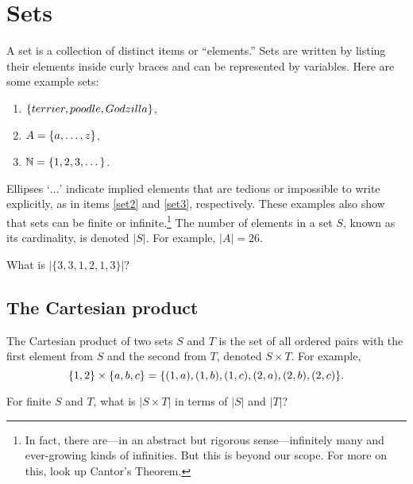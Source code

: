 \documentclass{book}
\begin{document}
\section{Sets}
A set is a collection of distinct items or ``elements.'' Sets are written by listing their elements inside curly braces and can be represented by variables. Here are some example sets:
\begin{enumerate}[label = (\arabic*)]
\item $\{terrier, poodle, Godzilla\}$,
\item\label{set2} $A = \{a, \dots, z\}$,
\item\label{set3} $\mathbb{N} = \{1, 2, 3, \dots\}$.
\end{enumerate}
Ellipses `{$\dots$}' indicate implied elements that are tedious or impossible to write explicitly, as in items \ref{set2} and \ref{set3}, respectively. These examples also show that sets can be finite or infinite.\footnote{In fact, there are---in an abstract but rigorous sense---infinitely many and ever-growing kinds of infinities. But this is beyond our scope. For more on this, look up Cantor's Theorem.} The number of elements in a set $S$, known as its cardinality, is denoted $|S|$. For example, $|A| = 26$.

\begin{exercise}\label{distinct}
What is $|\{3, 3, 1, 2, 1, 3\}|$?
\end{exercise}

\subsection{The Cartesian product}
The Cartesian product of two sets $S$ and $T$ is the set of all ordered pairs with the first element from $S$ and the second from $T$, denoted $S \times T$.
For example, \[\{1, 2\} \times \{a, b, c\} = \{(1, a), (1, b), (1, c), (2, a), (2, b), (2, c)\}.\]
\begin{exercise}\label{cartesianques}
For finite $S$ and $T$, what is $|S \times T|$ in terms of $|S|$ and $|T|$?
\end{exercise}


\end{document}
